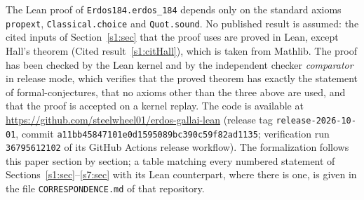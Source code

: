 The Lean proof of \texttt{Erdos184.\allowbreak erdos\_184} depends only on the
standard axioms \texttt{propext}, \texttt{Classical.choice} and
\texttt{Quot.sound}. No published result is assumed: the cited inputs of
Section~\ref{s1:sec} that the proof uses are proved in Lean, except Hall's
theorem (Cited result~\ref{s1:citHall}), which is taken from Mathlib. The proof
has been checked by the Lean kernel and by the independent checker
\emph{comparator} \cite{Comparator} in release mode, which verifies that the
proved theorem has exactly the statement of formal-conjectures, that no axioms
other than the three above are used, and that the proof is accepted on a kernel
replay. The code is available at
\url{https://github.com/steelwheel01/erdos-gallai-lean} \cite{EGRepo} (release
tag \texttt{release-2026-10-01}, commit
\texttt{a11bb45847101e0d1595089bc390c59f82ad1135}; verification run
\texttt{36795612102} of its GitHub Actions release workflow). The formalization
follows this paper section by section; a table matching every numbered
statement of Sections~\ref{s1:sec}--\ref{s7:sec} with its Lean counterpart, where
there is one, is given in the file \nolinkurl{CORRESPONDENCE.md} of that repository.
\par\endgroup
